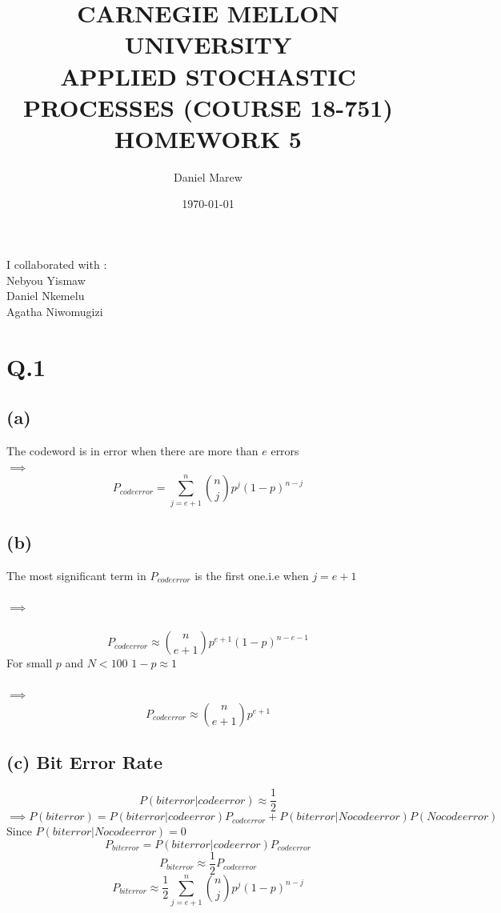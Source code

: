 \documentclass[a4paper,11pt]{article}
\begin{document}
\title{\color{red}CARNEGIE MELLON UNIVERSITY\\
APPLIED STOCHASTIC PROCESSES  (COURSE 18-751)\\
HOMEWORK 5}
\author{Daniel Marew}
\date{\today}
\clearpage\maketitle

\thispagestyle{empty}
\newpage
I collaborated with :\\
\hspace*{6cm}
Nebyou Yismaw\\
\hspace*{6cm}
Daniel    Nkemelu\\
\hspace*{6cm}
Agatha Niwomugizi
\thispagestyle{empty}
\newpage
\clearpage
\setcounter{page}{1}
\section*{Q.1}
\subsection*{(a)}
The codeword is in error when there are more than $e$ errors\\
$\implies$
$$P_{codeerror} =\sum_{j=e+1}^{n} \binom{n}{j}p^j(1-p)^{n-j}$$
\subsection*{(b)}
The most significant term in $P_{codeerror}$ is the first one.i.e when $j = e+1$\\\\
$\implies$\\\\
$$P_{codeerror} \approx \binom{n}{e+1}p^{e+1}(1-p)^{n-e-1}$$
For small $p$ and $N<100$ $1-p \approx 1$ \\\\
$\implies$\\
$$P_{codeerror} \approx \binom{n}{e+1}p^{e+1}$$
\subsection*{(c) Bit Error Rate}
$$P(biterror|codeerror) \approx \frac{1}{2}$$
$$\implies  P(biterror) = P(biterror|codeerror)P_{codeerror}+P(biterror|Nocodeerror)P(Nocodeerror)$$
Since $P(biterror|Nocodeerror) = 0$
$$ P_{biterror} = P(biterror|codeerror)P_{codeerror}$$
$$ P_{biterror} \approx \frac{1}{2}P_{codeerror}$$
$$ P_{biterror} \approx \frac{1}{2}\sum_{j=e+1}^{n} \binom{n}{j}p^j(1-p)^{n-j}$$
\newpage
\clearpage
\end{document}
